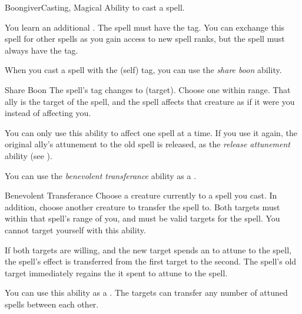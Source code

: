     \begin{feat}{Boongiver}{Casting, Magical}
        \featpre Ability to cast a spell.

         You learn an additional .
        The spell must have the  tag.
        You can exchange this spell for other spells as you gain access to new spell ranks, but the spell must always have the  tag.

         When you cast a spell with the  (self) tag, you can use the \textit{share boon} ability.
        \begin{freeability}{Share Boon}
            The spell's  tag changes to  (target).
            Choose one  within \rngmed range.
            That ally is the target of the spell, and the spell affects that creature as if it were you instead of affecting you.

            You can only use this ability to affect one spell at a time.
            If you use it again, the original ally's attunement to the old spell is released, as the \textit{release attunement} ability (see ).
        \end{freeability}

         You can use the \textit{benevolent transferance} ability as a .
        \begin{freeability}{Benevolent Transferance}
            Choose a creature currently  to a spell you cast.
            In addition, choose another creature to transfer the spell to.
            Both targets must within that spell's range of you, and must be valid targets for the spell.
            You cannot target yourself with this ability.

            If both targets are willing, and the new target spends an  to attune to the spell, the spell's effect is transferred from the first target to the second.
            The spell's old target immediately regains the  it spent to attune to the spell.

            \rankline
             You can use this ability as a .
             The targets can transfer any number of attuned spells between each other.
        \end{freeability}


\end{feat}
